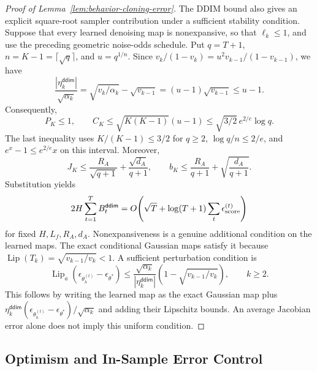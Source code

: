 \begin{proof}[Proof of Lemma~\ref{lem:behavior-cloning-error}]
The DDIM bound also gives an explicit square-root sampler contribution under
a sufficient stability condition. Suppose that every learned denoising map is
nonexpansive, so that $\ell_k\le1$, and use the preceding geometric noise-odds
schedule. Put $q=T+1$, $n=K-1=\lceil\sqrt q\rceil$, and
$u=q^{1/n}$. Since $v_k/(1-v_k)=u^2v_{k-1}/(1-v_{k-1})$, we have
\[
 \frac{|\eta_k^{\mathsf{ddim}}|}{\sqrt{\alpha_k}}
 =\sqrt{v_k/\alpha_k}-\sqrt{v_{k-1}}
 =(u-1)\sqrt{v_{k-1}}\le u-1.
\]
Consequently,
\[
 P_K\le1,\qquad C_K\le\sqrt{K(K-1)}(u-1)
 \le\sqrt{3/2}\,e^{2/e}\log q.
\]
The last inequality uses $K/(K-1)\le3/2$ for $q\ge2$,
$\log q/n\le2/e$, and $e^x-1\le e^{2/e}x$ on this interval.
Moreover,
\[
 J_K\le \frac{R_A}{\sqrt{q+1}}+\frac{\sqrt{d_A}}{q+1},
 \qquad b_K\le\frac{R_A}{q+1}+\sqrt{\frac{d_A}{q+1}}.
\]
Substitution yields
\[
 2H\sum_{t=1}^T B_t^{\mathsf{ddim}}
 =O\!\left(\sqrt T+\log(T+1)\sum_t\epsilon_{\text{score}}^{(t)}\right)
\]
for fixed $H,L_f,R_A,d_A$. Nonexpansiveness is a genuine additional condition
on the learned maps. The exact conditional Gaussian maps satisfy it because
$\operatorname{Lip}(T_k)=\sqrt{v_{k-1}/v_k}<1$. A sufficient perturbation
condition is
\[
 \operatorname{Lip}_a(\epsilon_{\theta_h^{(t)}}-\epsilon_{\theta^*})
 \le\frac{\sqrt{\alpha_k}}{|\eta_k^{\mathsf{ddim}}|}
          \left(1-\sqrt{v_{k-1}/v_k}\right),\qquad k\ge2.
\]
This follows by writing the learned map as the exact Gaussian map plus
$\eta_k^{\mathsf{ddim}}(\epsilon_{\theta_h^{(t)}}-\epsilon_{\theta^*})/
\sqrt{\alpha_k}$ and adding their Lipschitz bounds. An average Jacobian error
alone does not imply this uniform condition.
\end{proof}


\subsection{Optimism and In-Sample Error Control}

